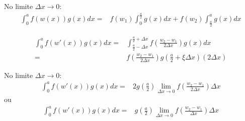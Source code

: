 No limite $\Delta x \to 0$:
\begin{align}
\int_0^a f(w(x))g(x)dx = 
& f(w_1) \int_0^{\frac{a}{2}} g(x)dx
+ 
f(w_2)\int_{\frac{a}{2}}^a g(x)dx
\end{align}

\newpage
\begin{align}
\int_0^a f(w'(x))g(x)dx = & \int_{\frac{a}{2} - \Delta x}^{\frac{a}{2} + \Delta x} f\left(\frac{w_2 - w_1}{2\Delta x}\right) g(x)dx \nonumber \\
= & f\left(\frac{w_2 - w_1}{2\Delta x}\right) g\left(\frac{a}{2} + \xi\Delta x\right) (2\Delta x)
\end{align}

No limite $\Delta x \to 0$:
\begin{align}
\int_0^a f(w'(x))g(x)dx = & 2 g\left(\frac{a}{2}\right) \lim_{\Delta x \to 0} f\left(\frac{w_2 - w_1}{2\Delta x}\right) \Delta x
\end{align}
ou
\begin{align}
\int_0^a f(w'(x))g(x)dx = & g\left(\frac{a}{2}\right) \lim_{\Delta x \to 0} f\left(\frac{w_2 - w_1}{\Delta x}\right) \Delta x
\end{align}